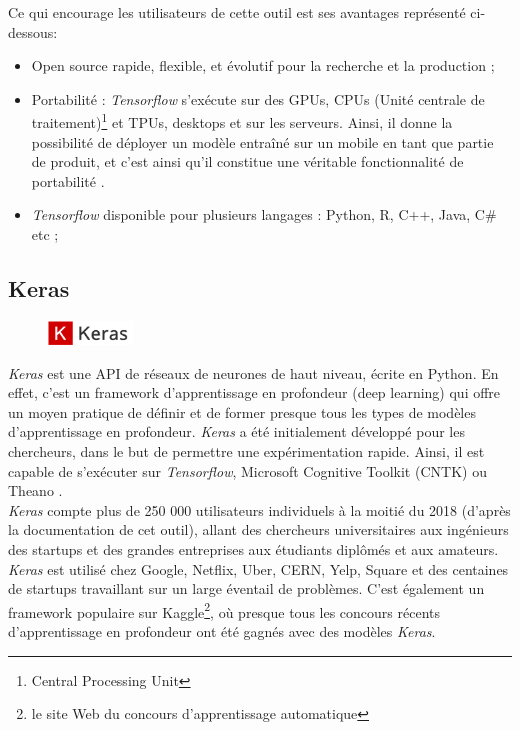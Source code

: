 Ce qui encourage les utilisateurs de cette outil est ses avantages représenté ci-dessous:
\begin{itemize}
\item[\textbullet] Open source rapide, flexible, et évolutif pour la recherche et la production ;
\item[\textbullet] Portabilité : \textit{Tensorflow} s'exécute sur des GPUs, CPUs (Unité centrale de traitement)\footnote{ Central Processing Unit } et TPUs, desktops et sur les serveurs. Ainsi, il donne la possibilité de déployer un modèle entraîné sur un mobile en tant que partie de produit, et c'est ainsi qu'il constitue une véritable fonctionnalité de portabilité \citep{softwebsolutions}.
\item[\textbullet] \textit{Tensorflow} disponible pour plusieurs langages : Python, R, C++, Java, C\# etc ;
\end{itemize}



\subsection{Keras}\label{defKeras}
\begin{figure}
    \includegraphics[width=0.2\textwidth]{img/keraslogo.png}
\end{figure}
\textit{Keras} est une API de réseaux de neurones de haut niveau, écrite en Python. En effet, c'est un framework d’apprentissage en profondeur (deep learning) qui offre un moyen pratique de définir et de former presque tous les types de modèles d’apprentissage en profondeur. \textit{Keras} a été initialement développé pour les chercheurs, dans le but de permettre une expérimentation rapide. Ainsi, il est capable de s'exécuter sur \textit{Tensorflow}, Microsoft Cognitive Toolkit (CNTK) ou Theano \citep{Chollet2018}.\\

\textit{Keras} compte plus de 250 000 utilisateurs individuels à la moitié du 2018 (d'après la documentation de cet outil), allant des chercheurs universitaires aux ingénieurs des startups et des grandes entreprises aux étudiants diplômés et aux amateurs. \textit{Keras} est utilisé chez Google, Netflix, Uber, CERN, Yelp, Square et des centaines de startups travaillant sur un large éventail de problèmes. C'est également un framework populaire sur Kaggle\footnote{le site Web du concours d’apprentissage automatique}, où presque tous les concours récents d’apprentissage en profondeur ont été gagnés avec des modèles \textit{Keras}.\\


